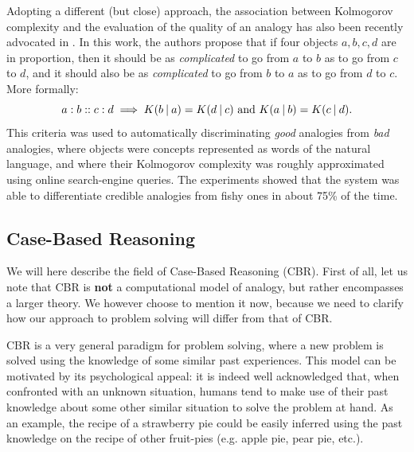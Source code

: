 Adopting a different (but close) approach, the association between Kolmogorov
complexity and the evaluation of the quality of an analogy has also been
recently advocated in \cite{BayPraRic12}. In this work, the authors propose
that if four objects $a, b, c, d$ are in proportion, then it should be as
\textit{complicated} to go from $a$ to $b$ as to go from $c$ to $d$, and it
should also be as \textit{complicated} to go from $b$ to $a$ as to go from $d$
to $c$. More formally:
$$a:b::c:d \implies K(b \:\vert\: a) = K(d \:\vert\: c) \text{ and } K(a \:\vert\: b) =
K(c \:\vert\: d).$$
This criteria was used to automatically discriminating \textit{good} analogies
from \textit{bad} analogies, where objects were concepts represented as words
of the natural language, and where their Kolmogorov complexity was roughly
approximated using online search-engine queries. The experiments showed that
the system was able to differentiate credible analogies from fishy ones in
about 75\% of the time.

\subsection{Case-Based Reasoning}

We will here describe the field of Case-Based Reasoning (CBR). First of all,
let us note that CBR is \textbf{not} a computational model of analogy, but
rather encompasses a larger theory. We however choose to mention it now, because
we need to clarify how our approach to problem solving will differ from that of
CBR.

CBR is a very general paradigm for problem solving, where a new problem is
solved using the knowledge of some similar past experiences. This model can be
motivated by its psychological appeal: it is indeed well acknowledged that,
when confronted with an unknown situation, humans tend to make use of their
past knowledge about some other similar situation to solve the problem at hand.
As an example, the recipe of a strawberry pie could be easily inferred using
the past knowledge on the recipe of other fruit-pies (e.g. apple pie, pear pie,
etc.).

